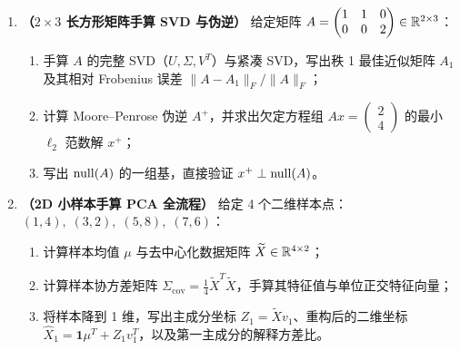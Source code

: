 \begin{enumerate}[label=\textbf{4.\arabic*}, leftmargin=2.4em, resume]
  \item \textbf{（$2\times 3$ 长方形矩阵手算 SVD 与伪逆）} 给定矩阵 $A = \begin{pmatrix} 1 & 1 & 0 \\ 0 & 0 & 2 \end{pmatrix} \in \mathbb{R}^{2\times 3}$：
  \begin{enumerate}[label=(\arabic*), leftmargin=1.8em]
    \item 手算 $A$ 的完整 SVD（$U, \Sigma, V^T$）与紧凑 SVD，写出秩 1 最佳近似矩阵 $A_1$ 及其相对 Frobenius 误差 $\|A - A_1\|_F / \|A\|_F$；
    \item 计算 Moore--Penrose 伪逆 $A^+$，并求出欠定方程组 $Ax = \begin{pmatrix}2 \\ 4\end{pmatrix}$ 的最小 $\ell_2$ 范数解 $x^+$；
    \item 写出 $\operatorname{null}(A)$ 的一组基，直接验证 $x^+ \perp \operatorname{null}(A)$。
  \end{enumerate}

  \item \textbf{（2D 小样本手算 PCA 全流程）} 给定 4 个二维样本点：$(1,4),\; (3,2),\; (5,8),\; (7,6)$：
  \begin{enumerate}[label=(\arabic*), leftmargin=1.8em]
    \item 计算样本均值 $\mu$ 与去中心化数据矩阵 $\widetilde{X} \in \mathbb{R}^{4\times 2}$；
    \item 计算样本协方差矩阵 $\Sigma_{\mathrm{cov}} = \frac{1}{4}\widetilde{X}^T\widetilde{X}$，手算其特征值与单位正交特征向量；
    \item 将样本降到 1 维，写出主成分坐标 $Z_1 = \widetilde{X} v_1$、重构后的二维坐标 $\widehat{X}_1 = \mathbf{1}\mu^T + Z_1 v_1^T$，以及第一主成分的解释方差比。
  \end{enumerate}
\end{enumerate}


